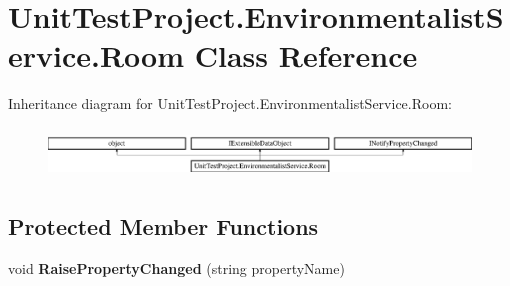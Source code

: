 \hypertarget{class_unit_test_project_1_1_environmentalist_service_1_1_room}{}\section{Unit\+Test\+Project.\+Environmentalist\+Service.\+Room Class Reference}
\label{class_unit_test_project_1_1_environmentalist_service_1_1_room}
Inheritance diagram for Unit\+Test\+Project.\+Environmentalist\+Service.\+Room\+:\begin{figure}[H]
\begin{center}
\leavevmode
\includegraphics[height=1.338112cm]{class_unit_test_project_1_1_environmentalist_service_1_1_room}
\end{center}
\end{figure}
\subsection*{Protected Member Functions}
\begin{DoxyCompactItemize}
\item 
\hypertarget{class_unit_test_project_1_1_environmentalist_service_1_1_room_a2382ebf3b76b3edf7d2c9cef3b70e589}{}void {\bfseries Raise\+Property\+Changed} (string property\+Name)\label{class_unit_test_project_1_1_environmentalist_service_1_1_room_a2382ebf3b76b3edf7d2c9cef3b70e589}

\end{DoxyCompactItemize}
